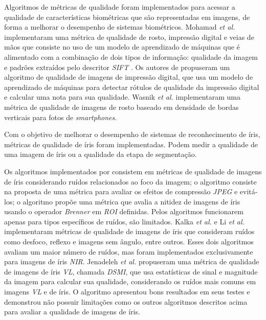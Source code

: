 \par Algoritmos de métricas de qualidade foram implementados para acessar a qualidade de características biométricas que são representadas em imagens, de forma a melhorar o desempenho de sistemas biométricos. Mohamad \textit{et al.} \cite{mohamad2015} implementaram uma métrica de qualidade de rosto, impressão digital e veias de mãos que consiste no uso de um modelo de aprendizado de máquinas que é alimentado com a combinação de dois tipos de informação: qualidade da imagem e padrões extraídos pelo descritor \textit{\acrshort{SIFT}} \cite{lowe2004}. Os autores de \cite{sharma2017} propuseram um algoritmo de qualidade de imagens de impressão digital, que usa um modelo de aprendizado de máquinas para detectar rótulos de qualidade da impressão digital e calcular uma nota para sua qualidade. Wasnik \textit{et al.} \cite{wasnik2017} implementaram uma métrica de qualidade de imagens de rosto baseado em densidade de bordas verticais para fotos de \textit{smartphones}.

\par Com o objetivo de melhorar o desempenho de sistemas de reconhecimento de íris, métricas de qualidade de íris foram implementadas. Podem medir a qualidade de uma imagem de íris ou a qualidade da etapa de segmentação.

\par Os algoritmos implementados por \cite{daugman2004, starovoitov2013-DSMI-45, wan2007-DSMI-50} consistem em métricas de qualidade de imagens de íris considerando ruídos relacionados ao foco da imagem; o algoritmo \cite{bergmller2017-DSMI-2} consiste na proposta de uma métrica para avaliar os efeitos de compressão \textit{JPEG} e evitá-los; o algoritmo \cite{chen2013-DSMI-4} propõe uma métrica que avalia a nitidez de imagens de íris usando o operador \textit{Brenner} em \textit{\acrfull{ROI}} definidas. Pelos algoritmos \cite{daugman2004, starovoitov2013-DSMI-45, wan2007-DSMI-50,bergmller2017-DSMI-2,chen2013-DSMI-4} funcionarem apenas para tipos específicos de ruídos, são limitados. Kalka \textit{et al.} \cite{kalka2010-DSMI-18} e Li \textit{et al.} \cite{li2011} implementaram métricas de qualidade de imagens de íris que consideram ruídos como desfoco, reflexo e imagens sem ângulo, entre outros. Esses dois algoritmos avaliam um maior número de ruídos, mas foram implementados exclusivamente para imagens de íris \textit{\acrshort{NIR}}. Jenadeleh \textit{et al.} \cite{Jenadeleh_2018_CVPR_Workshops} propuseram uma métrica de qualidade de imagens de íris \textit{\acrshort{VL}}, chamada \textit{\acrshort{DSMI}}, que usa estatísticas de sinal e magnitude da imagem para calcular sua qualidade, considerando os ruídos mais comuns em imagens \textit{\acrshort{VL}} e de íris. O algoritmo apresentou bons resultados em seus testes e demonstrou não possuir limitações como os outros algoritmos descritos acima para avaliar a qualidade de imagens de íris.

